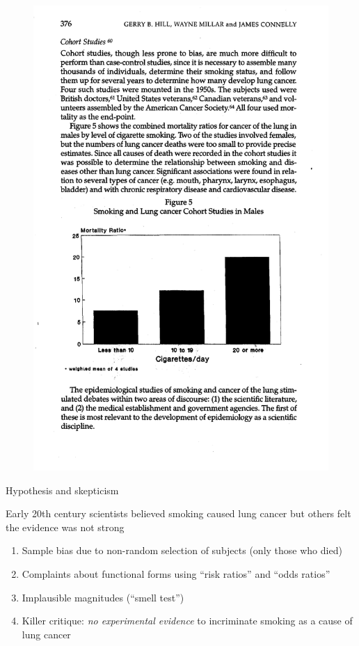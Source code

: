 \documentclass{beamer}
\begin{document}
\begin{frame}[plain]
	\begin{figure}
	\includegraphics[scale=0.5]{./lecture_includes/smoking_figure2.pdf}
	\end{figure}

\end{frame}	
	

	


\begin{frame}{Hypothesis and skepticism}

Early 20th century scientists believed smoking caused lung cancer but others felt the evidence was not strong
		\begin{enumerate}
		\item Sample bias due to non-random selection of subjects (only those who died)
		\item Complaints about functional forms using ``risk ratios'' and ``odds ratios''
		\item Implausible magnitudes (``smell test'')
		\item Killer critique: \emph{no experimental evidence} to incriminate smoking as a cause of lung cancer
		\end{enumerate}
\end{frame}
\end{document}
